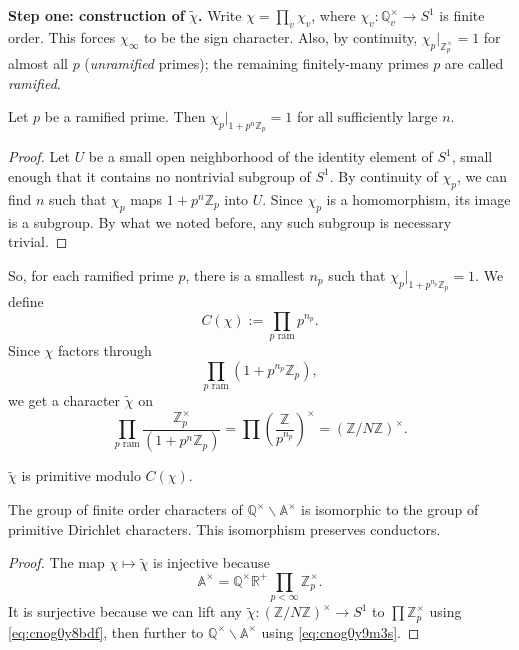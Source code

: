 \documentclass[reqno]{amsart} 
\begin{document}
\textbf{Step one: construction of} $\tilde{\chi}$\textbf{.}  Write $\chi = \prod_v \chi_v$, where $\chi_v : \mathbb{Q}_v^\times \rightarrow S^1$ is finite order.  This forces $\chi_\infty$ to be the sign character.  Also, by continuity, $\chi_p |_{\mathbb{Z}_p^\times} = 1$ for almost all $p$ (\emph{unramified} primes); the remaining finitely-many primes $p$ are called \emph{ramified}.

\begin{claim}
  Let $p$ be a ramified prime.  Then $\chi_p |_{1 + p^n \mathbb{Z}_p} = 1$ for all sufficiently large $n$.
\end{claim}
\begin{proof}
  Let $U$ be a small open neighborhood of the identity element of $S^1$, small enough that it contains no nontrivial subgroup of $S^1$.  By continuity of $\chi_p$, we can find $n$ such that $\chi_p$ maps $1 + p^n \mathbb{Z}_p$ into $U$.  Since $\chi_p$ is a homomorphism, its image is a subgroup.  By what we noted before, any such subgroup is necessary trivial.
\end{proof}

So, for each ramified prime $p$, there is a smallest $n_p$ such that $\chi_p |_{1 + p^{n_p} \mathbb{Z}_p } = 1$.  We define
\begin{equation*}
  C(\chi) := \prod_{p \text{ ram}}
  p^{n_p}.
\end{equation*}
Since $\chi$ factors through
\begin{equation*}
  \prod_{p \text{ ram}}
  (1 + p^{n_p} \mathbb{Z}_p),  
\end{equation*}
we get a character $\tilde{\chi}$ on
\begin{equation}\label{eq:cnog0y8bdf}
  \prod_{p \text{ ram}}
  \frac{\mathbb{Z}_p^\times}{(1 + p^n \mathbb{Z}_p)}
  =
  \prod \left( \frac{\mathbb{Z}}{ p^{n_p}} \right)^\times
  =(\mathbb{Z} / N \mathbb{Z})^\times.  
\end{equation}

\begin{exercise}
  $\tilde{\chi}$ is primitive modulo $C(\chi)$.
\end{exercise}

\begin{theorem}
  The group of finite order characters of $\mathbb{Q}^\times \backslash \mathbb{A}^\times$ is isomorphic to the group of primitive Dirichlet characters.  This isomorphism preserves conductors.
\end{theorem}
\begin{proof}
  The map $\chi \mapsto \tilde{\chi}$ is injective because
  \begin{equation}\label{eq:cnog0y9m3s}
    \mathbb{A}^\times = \mathbb{Q}^\times \mathbb{R}^+ \prod_{p  < \infty} \mathbb{Z}_p^\times.
  \end{equation}
  It is surjective because we can lift any $\tilde{\chi} :(\mathbb{Z} / N \mathbb{Z} )^\times \rightarrow S^1$ to $\prod \mathbb{Z}_p^\times$ using \eqref{eq:cnog0y8bdf}, then further to $\mathbb{Q}^\times \backslash \mathbb{A}^\times$ using \eqref{eq:cnog0y9m3s}.
\end{proof}
\end{document}
